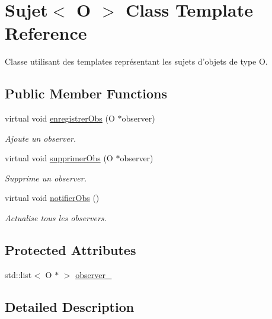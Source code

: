 \hypertarget{classSujet}{\section{Sujet$<$ O $>$ Class Template Reference}
\label{classSujet}
}


Classe utilisant des templates représentant les sujets d'objets de type O.  


\subsection*{Public Member Functions}
\begin{DoxyCompactItemize}
\item 
virtual void \hyperlink{classSujet_aca7d9e3c76913bb93e8d355cbd476a2a}{enregistrer\-Obs} (O $\ast$observer)
\begin{DoxyCompactList}\small\item\em Ajoute un observer. \end{DoxyCompactList}\item 
virtual void \hyperlink{classSujet_a6b7876a84608c2ffd61d5d61589ae2e8}{supprimer\-Obs} (O $\ast$observer)
\begin{DoxyCompactList}\small\item\em Supprime un observer. \end{DoxyCompactList}\item 
\hypertarget{classSujet_a74899bddc50941d8d360afb6025a5b88}{virtual void \hyperlink{classSujet_a74899bddc50941d8d360afb6025a5b88}{notifier\-Obs} ()}\label{classSujet_a74899bddc50941d8d360afb6025a5b88}

\begin{DoxyCompactList}\small\item\em Actualise tous les observers. \end{DoxyCompactList}\end{DoxyCompactItemize}
\subsection*{Protected Attributes}
\begin{DoxyCompactItemize}
\item 
std\-::list$<$ O $\ast$ $>$ \hyperlink{classSujet_a12ee36985ce73e7d73e70da6fcf22e89}{observer\-\_\-}
\end{DoxyCompactItemize}


\subsection{Detailed Description}
